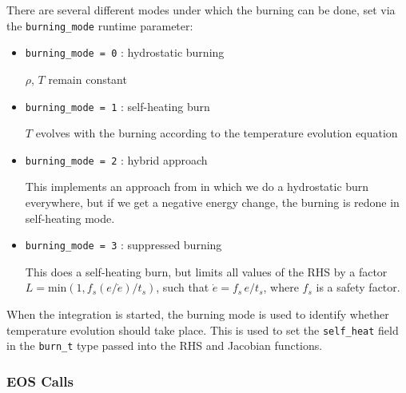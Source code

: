 There are several different modes under which the burning can be done, set
via the {\tt burning\_mode} runtime parameter:
\begin{itemize}
\item {\tt burning\_mode = 0} : hydrostatic burning

  $\rho$, $T$ remain constant

\item {\tt burning\_mode = 1} : self-heating burn

  $T$ evolves with the burning according to the temperature evolution equation

\item {\tt burning\_mode = 2} : hybrid approach

  This implements an approach from \cite{raskin:2010} in which we do a 
  hydrostatic burn everywhere, but if we get a negative energy change,
  the burning is redone in self-heating mode.

\item {\tt burning\_mode = 3} : suppressed burning

  This does a self-heating burn, but limits all values of the RHS
  by a factor $L = \text{min}(1, f_s (e / \dot{e}) / t_s)$, such
  that $\dot{e} = f_s\, e / t_s$, where $f_s$ is a safety factor.

\end{itemize}

When the integration is started, the burning mode is used to identify
whether temperature evolution should take place.  This is used to
set the {\tt self\_heat} field in the {\tt burn\_t} type passed
into the RHS and Jacobian functions.



\subsubsection{EOS Calls}


